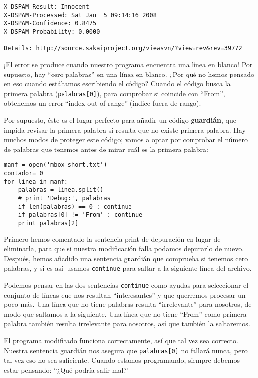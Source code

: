 \begin{enumerate}
\beforeverb
\begin{verbatim}
X-DSPAM-Result: Innocent
X-DSPAM-Processed: Sat Jan  5 09:14:16 2008
X-DSPAM-Confidence: 0.8475
X-DSPAM-Probability: 0.0000

Details: http://source.sakaiproject.org/viewsvn/?view=rev&rev=39772
\end{verbatim}
\afterverb
%
¡El error se produce cuando nuestro programa encuentra una línea en blanco! Por supuesto,
hay ``cero palabras'' en una línea en blanco. ¿Por qué no hemos pensado en eso
cuando estábamos escribiendo el código? Cuando el código busca la primera
palabra (\verb"palabras[0]"), para comprobar si coincide con ``From'',
obtenemos un error ``index out of range'' (índice fuera de rango).

Por supuesto, éste es el lugar perfecto para añadir un código {\bf guardián},
que impida revisar la primera palabra si resulta que no existe primera palabra.
Hay muchos modos de proteger este código; vamos a optar por
comprobar el número de palabras que tenemos antes de mirar cuál es la primera palabra:

\beforeverb
\begin{verbatim}
manf = open('mbox-short.txt')
contador= 0
for linea in manf:
    palabras = linea.split()
    # print 'Debug:', palabras
    if len(palabras) == 0 : continue
    if palabras[0] != 'From' : continue
    print palabras[2]
\end{verbatim}
\afterverb
%
Primero hemos comentado la sentencia print de depuración en lugar de eliminarla,
para que si nuestra modificación falla podamos depurarlo de nuevo. Después, hemos añadido
una sentencia guardián que comprueba si tenemos cero palabras, y si es así,
usamos {\tt continue} para saltar a la siguiente línea del archivo. 

Podemos pensar en las dos sentencias {\tt continue} como ayudas para seleccionar
el conjunto de líneas que nos resultan ``interesantes'' y que querremos
procesar un poco más. Una línea que no tiene palabras resulta ``irrelevante'' para
nosotros, de modo que saltamos a la siguiente. Una línea que no tiene ``From''
como primera palabra también resulta irrelevante para nosotros, así que también la saltaremos.

El programa modificado funciona correctamente, así que tal vez sea correcto. Nuestra
sentencia guardián nos asegura que {\tt palabras[0]} no fallará nunca,
pero tal vez eso no sea suficiente. Cuando estamos programando, siempre debemos
estar pensando: ``¿Qué podría salir mal?''


\end{enumerate}
